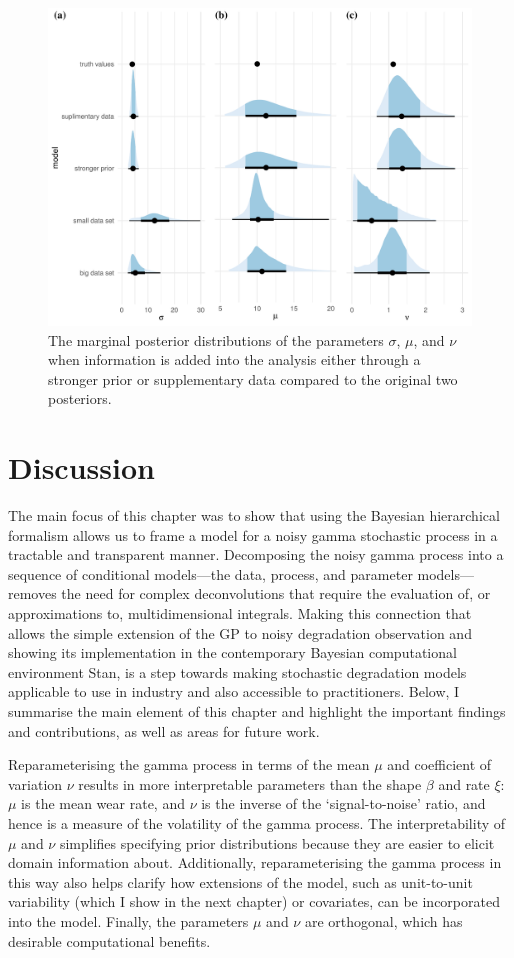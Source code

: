 \begin{figure}
  \centering
  \includegraphics[width=0.8\columnwidth]{./figures/ch-4/marginal-post-extra-info.pdf}
  \caption{The marginal posterior distributions of the parameters $\sigma$, $\mu$, and $\nu$ when information is added into the analysis either through a stronger prior or supplementary data compared to the original two posteriors.}
  \label{fig:marginal-post-extra-info}
\end{figure}

\section{Discussion} \label{sec:NGP-discussion}

The main focus of this chapter was to show that using the Bayesian hierarchical formalism allows us to frame a model for a noisy gamma stochastic process in a tractable and transparent manner. Decomposing the noisy gamma process into a sequence of conditional models---the data, process, and parameter models---removes the need for complex deconvolutions that require the evaluation of, or approximations to, multidimensional integrals. Making this connection that allows the simple extension of the GP to noisy degradation observation and showing its implementation in the contemporary Bayesian computational environment Stan, is a step towards making stochastic degradation models applicable to use in industry and also accessible to practitioners. Below, I summarise the main element of this chapter and highlight the important findings and contributions, as well as areas for future work.

Reparameterising the gamma process in terms of the mean $\mu$ and coefficient of variation $\nu$ results in more interpretable parameters than the shape $\beta$ and rate $\xi$: $\mu$ is the mean wear rate, and $\nu$ is the inverse of the `signal-to-noise' ratio, and hence is a measure of the volatility of the gamma process. The interpretability of $\mu$ and $\nu$ simplifies specifying prior distributions because they are easier to elicit domain information about. Additionally, reparameterising the gamma process in this way also helps clarify how extensions of the model, such as unit-to-unit variability (which I show in the next chapter) or covariates, can be incorporated into the model. Finally, the parameters $\mu$ and $\nu$ are orthogonal, which has desirable computational benefits.

